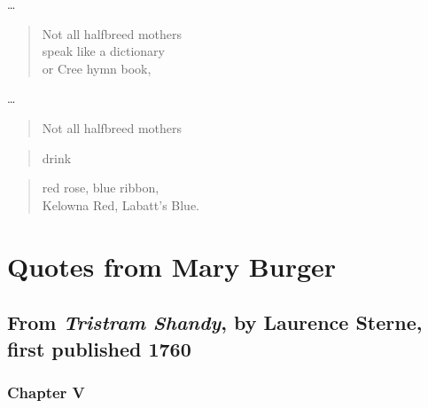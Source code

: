 \documentclass[
]{memoir}
\begin{document}
\ldots{}

\begin{verse}
Not all halfbreed mothers\\
speak like a dictionary\\
or Cree hymn book,\\
\end{verse}

\ldots{}

\begin{verse}
Not all halfbreed mothers\\
\end{verse}

\begin{verse}
drink\\
\end{verse}

\begin{verse}
red rose, blue ribbon,\\
Kelowna Red, Labatt’s Blue.\\
\end{verse}

\hypertarget{quotes-from-mary-burger}{%
\section*{Quotes from Mary Burger}\label{quotes-from-mary-burger}}

\hypertarget{from-tristram-shandy-by-laurence-sterne-first-published-1760}{%
\subsection*{\texorpdfstring{From \emph{Tristram Shandy}, by Laurence
Sterne, first published
1760}{From Tristram Shandy, by Laurence Sterne, first published 1760}}\label{from-tristram-shandy-by-laurence-sterne-first-published-1760}}

\hypertarget{chapter-v}{%
\subsubsection*{Chapter V}\label{chapter-v}}
\end{document}
